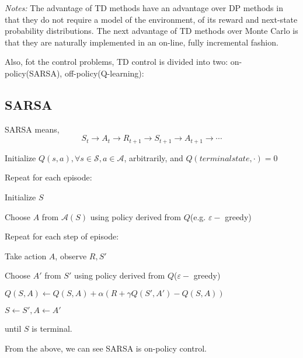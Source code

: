 \documentclass[11pt,a4paper]{article}
\def\S{{\mathcal S}}
\def\A{{\mathcal A}}
\begin{document}
\emph{Notes:} The advantage of TD methods have an advantage over DP methods in that they do not require a model of the environment, of its reward and next-state probability distributions. The next advantage of TD methods over Monte Carlo is that they are naturally implemented in an on-line, fully incremental fashion. \par 
Also, fot the control problems, TD control is divided into two: on-policy(SARSA), off-policy(Q-learning):
\subsection{SARSA}
SARSA means,
$$
S_{t} \to A_{t} \to R_{t+1} \to S_{t+1} \to A_{t+1} \to \cdots 
$$
\begin{tcolorbox}
Initialize $Q(s,a), \forall s\in \S, a\in \A$, arbitrarily, and $Q(terminal state, \cdot) = 0$ \par 
Repeat for each episode: \par 
\hspace{1cm} Initialize $S$ \par 
\hspace{1cm} Choose $A$ from $\A(S)$ using policy derived from $Q$(e.g. $\varepsilon-$ greedy) \par 
\hspace{1cm} Repeat for each step of episode: \par 
\hspace{2cm} Take action $A$, observe $R, S'$ \par 
\hspace{2cm} Choose $A'$ from $S'$ using policy derived from $Q$($\varepsilon-$ greedy)\par 
\hspace{2cm} $Q(S,A) \leftarrow Q(S,A) + \alpha(R + \gamma Q(S',A')-Q(S,A))$ \par 
\hspace{2cm} $S \leftarrow S', A \leftarrow A'$\par 
\hspace{1cm} until $S$ is terminal.
\end{tcolorbox}
From the above, we can see SARSA is on-policy control.
\end{document}
